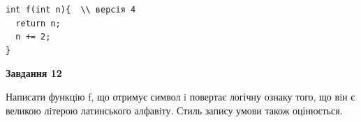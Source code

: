 \documentclass[12pt, ukrainian]{article}
\begin{document}
{\begin {large}
\begin{minipage}[t]{11.0cm}
\vspace{-8mm}\begin{verbatim}
int f(int n){  \\ версія 4
  return n;
  n += 2;
}
\end{verbatim}



\begin{center}
\textbf{Завдання 12}
\end{center}

Написати функцiю f, що отримує символ i повертає логічну ознаку того, що вiн є великою лiтерою латинського алфавiту. Стиль запису умови також оцінюється.\par

\end{minipage}

\end {large}}
\newpage
\end{document}
